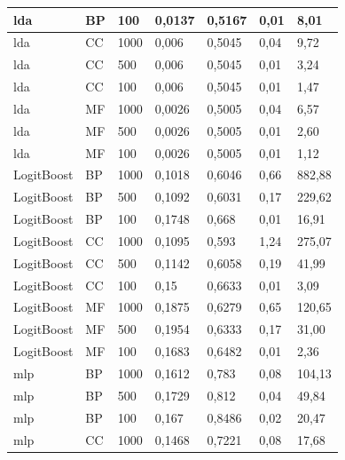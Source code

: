 \documentclass[12pt]{report}
\begin{document}
\begin{appendices}
\begin{longtable}[h]{|l|l|l|l|l|l|l|}
lda          & BP   & 100     & 0,0137 & 0,5167 & 0,01            & 8,01        \\ \hline
lda          & CC   & 1000    & 0,006  & 0,5045 & 0,04            & 9,72        \\ \hline
lda          & CC   & 500     & 0,006  & 0,5045 & 0,01            & 3,24        \\ \hline
lda          & CC   & 100     & 0,006  & 0,5045 & 0,01            & 1,47        \\ \hline
lda          & MF   & 1000    & 0,0026 & 0,5005 & 0,04            & 6,57        \\ \hline
lda          & MF   & 500     & 0,0026 & 0,5005 & 0,01            & 2,60        \\ \hline
lda          & MF   & 100     & 0,0026 & 0,5005 & 0,01            & 1,12        \\ \hline
LogitBoost   & BP   & 1000    & 0,1018 & 0,6046 & 0,66            & 882,88      \\ \hline
LogitBoost   & BP   & 500     & 0,1092 & 0,6031 & 0,17            & 229,62      \\ \hline
LogitBoost   & BP   & 100     & 0,1748 & 0,668  & 0,01            & 16,91       \\ \hline
LogitBoost   & CC   & 1000    & 0,1095 & 0,593  & 1,24            & 275,07      \\ \hline
LogitBoost   & CC   & 500     & 0,1142 & 0,6058 & 0,19            & 41,99       \\ \hline
LogitBoost   & CC   & 100     & 0,15   & 0,6633 & 0,01            & 3,09        \\ \hline
LogitBoost   & MF   & 1000    & 0,1875 & 0,6279 & 0,65            & 120,65      \\ \hline
LogitBoost   & MF   & 500     & 0,1954 & 0,6333 & 0,17            & 31,00       \\ \hline
LogitBoost   & MF   & 100     & 0,1683 & 0,6482 & 0,01            & 2,36        \\ \hline
mlp          & BP   & 1000    & 0,1612 & 0,783  & 0,08            & 104,13      \\ \hline
mlp          & BP   & 500     & 0,1729 & 0,812  & 0,04            & 49,84       \\ \hline
mlp          & BP   & 100     & 0,167  & 0,8486 & 0,02            & 20,47       \\ \hline
mlp          & CC   & 1000    & 0,1468 & 0,7221 & 0,08            & 17,68       \\ \hline

\end{longtable}
\end{appendices}
\end{document}
